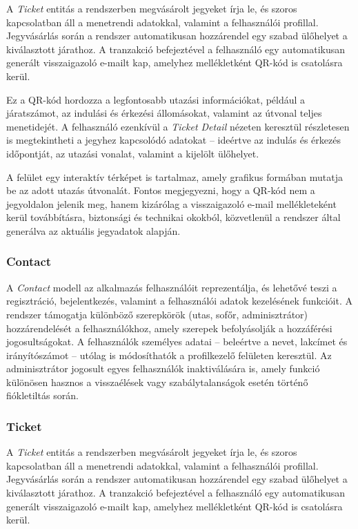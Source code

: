 A \textit{Ticket} entitás a rendszerben megvásárolt jegyeket írja le, és szoros kapcsolatban áll a menetrendi adatokkal, valamint a felhasználói profillal. Jegyvásárlás során a rendszer automatikusan hozzárendel egy szabad ülőhelyet a kiválasztott járathoz. A tranzakció befejeztével a felhasználó egy automatikusan generált visszaigazoló e-mailt kap, amelyhez mellékletként QR-kód is csatolásra kerül.

Ez a QR-kód hordozza a legfontosabb utazási információkat, például a járatszámot, az indulási és érkezési állomásokat, valamint az útvonal teljes menetidejét. A felhasználó ezenkívül a \textit{Ticket Detail} nézeten keresztül részletesen is megtekintheti a jegyhez kapcsolódó adatokat – ideértve az indulás és érkezés időpontját, az utazási vonalat, valamint a kijelölt ülőhelyet.

A felület egy interaktív térképet is tartalmaz, amely grafikus formában mutatja be az adott utazás útvonalát. Fontos megjegyezni, hogy a QR-kód nem a jegyoldalon jelenik meg, hanem kizárólag a visszaigazoló e-mail mellékleteként kerül továbbításra, biztonsági és technikai okokból, közvetlenül a rendszer által generálva az aktuális jegyadatok alapján.




\subsubsection{Contact}

A \textit{Contact} modell az alkalmazás felhasználóit reprezentálja, és lehetővé teszi a regisztráció, bejelentkezés, valamint a felhasználói adatok kezelésének funkcióit. A rendszer támogatja különböző szerepkörök (utas, sofőr, adminisztrátor) hozzárendelését a felhasználókhoz, amely szerepek befolyásolják a hozzáférési jogosultságokat. A felhasználók személyes adatai – beleértve a nevet, lakcímet és irányítószámot – utólag is módosíthatók a profilkezelő felületen keresztül. Az adminisztrátor jogosult egyes felhasználók inaktiválására is, amely funkció különösen hasznos a visszaélések vagy szabálytalanságok esetén történő fiókletiltás során.

\subsubsection{Ticket}

A \textit{Ticket} entitás a rendszerben megvásárolt jegyeket írja le, és szoros kapcsolatban áll a menetrendi adatokkal, valamint a felhasználói profillal. Jegyvásárlás során a rendszer automatikusan hozzárendel egy szabad ülőhelyet a kiválasztott járathoz. A tranzakció befejeztével a felhasználó egy automatikusan generált visszaigazoló e-mailt kap, amelyhez mellékletként QR-kód is csatolásra kerül.

